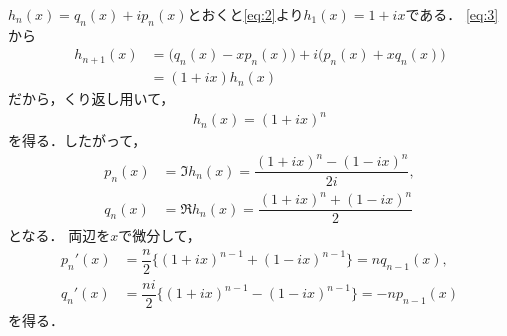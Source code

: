 \documentclass[../../main.tex]{subfiles}
\begin{document}
$h_n(x)=q_n(x)+ip_n(x)$とおくと\cref{eq:2}より$h_1(x)=1+ix$である．
\cref{eq:3}から
\begin{align}
  h_{n+1}(x)
  &=\bigl(q_n(x)-xp_n(x)\bigr) +i\bigl(p_n(x)+xq_n(x)\bigr)\\
  &=(1+ix)h_n(x)
\end{align}
だから，くり返し用いて，
\begin{align}
  h_n(x)=(1+ix)^n
\end{align}
を得る．したがって，
\begin{align}
  p_n(x)
  &=\Im h_n(x)
  =\dfrac{(1+ix)^n-(1-ix)^n}{2i},\\
  q_n(x)
  &=\Re h_n(x)
  =\dfrac{(1+ix)^n+(1-ix)^n}{2}
\end{align}
となる．
両辺を$x$で微分して，
\begin{align}
  p_n'(x)
  &=\dfrac{n}{2}\bigl\{(1+ix)^{n-1}+(1-ix)^{n-1}\bigr\}
  =nq_{n-1}(x),\\
  q_n'(x)
  &=\dfrac{ni}{2}\bigl\{(1+ix)^{n-1}-(1-ix)^{n-1}\bigr\}
  =-np_{n-1}(x)
\end{align}
を得る．
\end{document}
